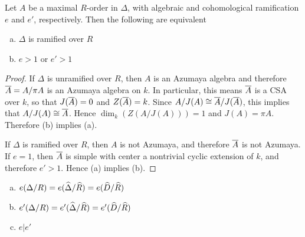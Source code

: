 \begin{prop}
Let $A$ be a maximal $R$-order in $\Delta$, with algebraic and cohomological ramification $e$ and $e'$, respectively.  Then the following are equivalent
\begin{enumerate}[(a)]
\item  $\Delta$ is ramified over $R$
\item  $e>1$ or $e'>1$
\end{enumerate}
\end{prop}
\begin{proof}
If $\Delta$ is unramified over $R$, then $A$ is an Azumaya algebra and therefore $\overline{A} = A/\pi A$ is an Azumaya algebra on $k$.  In particular, this means $\overline{A}$ is a CSA over $k$, so that $J(\overline{A}) = 0$ and $Z(\overline{A}) = k$.  Since $A/J(A)\cong \overline{A}/J(\overline{A})$, this implies that $A/J(A)\cong \overline{A}$.  Hence $\dim_k(Z(A/J(A))) = 1$ and $J(A) = \pi A$.  Therefore (b) implies (a).

If $\Delta$ is ramified over $R$, then $A$ is not Azumaya, and therefore $\overline{A}$ is not Azumaya.  If $e = 1$, then $\overline{A}$ is simple with center a nontrivial cyclic extension of $k$, and therefore $e'>1$.  Hence (a) implies (b).
\end{proof}

\begin{lem}\mbox{}
\begin{enumerate}[(a)]
\item  $e(\Delta/R) = e(\widehat\Delta/\widehat R) = e(\widehat D/\widehat R)$
\item  $e'(\Delta/R) = e'(\widehat\Delta/\widehat R) = e'(\widehat D/\widehat R)$
\item  $e|e'$
\end{enumerate}
\end{lem}



